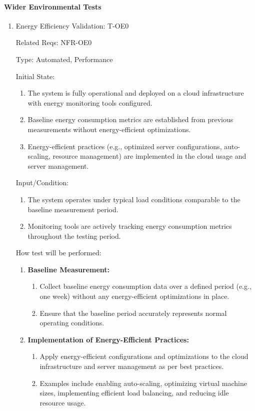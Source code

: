 \documentclass[12pt, titlepage]{article}
\begin{document}
\paragraph{Wider Environmental Tests}
\begin{enumerate}
\item{Energy Efficiency Validation: T-OE0\\}

Related Reqs: NFR-OE0

Type: Automated, Performance

Initial State:
\begin{enumerate}
    \item The system is fully operational and deployed on a cloud infrastructure with energy monitoring tools configured.
    \item Baseline energy consumption metrics are established from previous measurements without energy-efficient optimizations.
    \item Energy-efficient practices (e.g., optimized server configurations, auto-scaling, resource management) are implemented in the cloud usage and server management.
\end{enumerate}
Input/Condition:
\begin{enumerate}
    \item The system operates under typical load conditions comparable to the baseline measurement period.
    \item Monitoring tools are actively tracking energy consumption metrics throughout the testing period.
\end{enumerate}
How test will be performed:
\begin{enumerate}
    \item \textbf{Baseline Measurement:}
    \begin{enumerate}
        \item Collect baseline energy consumption data over a defined period (e.g., one week) without any energy-efficient optimizations in place.
        \item Ensure that the baseline period accurately represents normal operating conditions.
    \end{enumerate}
    
    \item \textbf{Implementation of Energy-Efficient Practices:}
    \begin{enumerate}
        \item Apply energy-efficient configurations and optimizations to the cloud infrastructure and server management as per best practices.
        \item Examples include enabling auto-scaling, optimizing virtual machine sizes, implementing efficient load balancing, and reducing idle resource usage.
    \end{enumerate}
    

\end{enumerate}
\end{enumerate}
\end{document}
